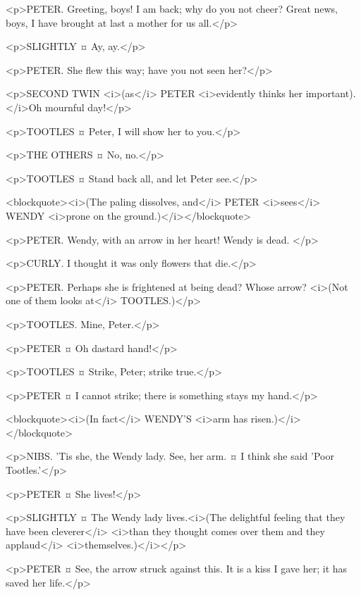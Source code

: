 <p>PETER. Greeting, boys!
I am back; why do you not cheer? Great news, boys, I have brought at last a mother for us all.</p>

<p>SLIGHTLY ¤
Ay, ay.</p>

<p>PETER. She flew this way; have you not seen her?</p>

<p>SECOND TWIN <i>(as</i> PETER <i>evidently thinks her important).</i>Oh mournful day!</p>

<p>TOOTLES ¤
Peter, I will show her to you.</p>

<p>THE OTHERS ¤
No, no.</p>

<p>TOOTLES ¤
Stand back all, and let Peter see.</p>

<blockquote><i>(The paling dissolves, and</i> PETER <i>sees</i> WENDY <i>prone on the ground.)</i></blockquote>

<p>PETER. Wendy, with an arrow in her heart!
Wendy is dead.
</p>

<p>CURLY. I thought it was only flowers that die.</p>

<p>PETER. Perhaps she is frightened at being dead?
Whose arrow? <i>(Not one of them looks at</i> TOOTLES.)</p>

<p>TOOTLES. Mine, Peter.</p>

<p>PETER ¤
Oh dastard hand!</p>

<p>TOOTLES ¤
Strike, Peter; strike true.</p>

<p>PETER ¤
I cannot strike; there is something stays my hand.</p>

<blockquote><i>(In fact</i> WENDY'S <i>arm has risen.)</i></blockquote>

<p>NIBS. 'Tis she, the Wendy lady. See, her arm.
¤
I think she said 'Poor Tootles.'</p>

<p>PETER ¤
She lives!</p>

<p>SLIGHTLY ¤
The Wendy lady lives.<i>(The delightful feeling that they have been cleverer</i> <i>than they thought comes over them and they applaud</i> <i>themselves.)</i></p>

<p>PETER ¤
See, the arrow struck against this. It is a kiss I gave her; it has saved her life.</p>

